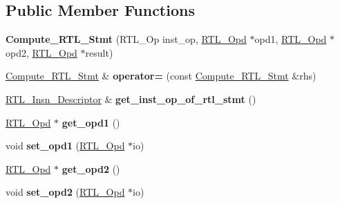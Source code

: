 \subsection*{Public Member Functions}
\begin{DoxyCompactItemize}
\item 
\mbox{\label{classCompute__RTL__Stmt_ab75c03cb392f5cd6ab91b8a88630c3f3}} 
{\bfseries Compute\+\_\+\+R\+T\+L\+\_\+\+Stmt} (R\+T\+L\+\_\+\+Op inst\+\_\+op, \hyperlink{classRTL__Opd}{R\+T\+L\+\_\+\+Opd} $\ast$opd1, \hyperlink{classRTL__Opd}{R\+T\+L\+\_\+\+Opd} $\ast$opd2, \hyperlink{classRTL__Opd}{R\+T\+L\+\_\+\+Opd} $\ast$result)
\item 
\mbox{\label{classCompute__RTL__Stmt_a9bd759f30ff8e04990796b2a136897ee}} 
\hyperlink{classCompute__RTL__Stmt}{Compute\+\_\+\+R\+T\+L\+\_\+\+Stmt} \& {\bfseries operator=} (const \hyperlink{classCompute__RTL__Stmt}{Compute\+\_\+\+R\+T\+L\+\_\+\+Stmt} \&rhs)
\item 
\mbox{\label{classCompute__RTL__Stmt_a9920d7823fd5d5c71c016ee39c081beb}} 
\hyperlink{classRTL__Insn__Descriptor}{R\+T\+L\+\_\+\+Insn\+\_\+\+Descriptor} \& {\bfseries get\+\_\+inst\+\_\+op\+\_\+of\+\_\+rtl\+\_\+stmt} ()
\item 
\mbox{\label{classCompute__RTL__Stmt_a534fc4122c89223060b7e9f5238daf84}} 
\hyperlink{classRTL__Opd}{R\+T\+L\+\_\+\+Opd} $\ast$ {\bfseries get\+\_\+opd1} ()
\item 
\mbox{\label{classCompute__RTL__Stmt_a2f37ebccfe81fa33558dd185afd94973}} 
void {\bfseries set\+\_\+opd1} (\hyperlink{classRTL__Opd}{R\+T\+L\+\_\+\+Opd} $\ast$io)
\item 
\mbox{\label{classCompute__RTL__Stmt_af87454a3a2f02b3416c5e4e818f70a17}} 
\hyperlink{classRTL__Opd}{R\+T\+L\+\_\+\+Opd} $\ast$ {\bfseries get\+\_\+opd2} ()
\item 
\mbox{\label{classCompute__RTL__Stmt_ab93a1f9cd8d50b168bdfa58708f1d917}} 
void {\bfseries set\+\_\+opd2} (\hyperlink{classRTL__Opd}{R\+T\+L\+\_\+\+Opd} $\ast$io)
\item 
\mbox{\label{classCompute__RTL__Stmt_a6d9de0ad00db8a49fd285686377e3e42}} 

\end{DoxyCompactItemize}
